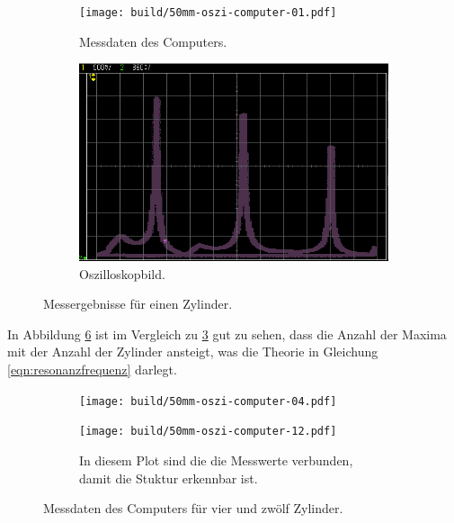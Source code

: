 \begin{figure}[ht]
    \centering
    \begin{subfigure}{0.49\textwidth}
        \centering
        \texttt{[image: build/50mm-oszi-computer-01.pdf]}
        \caption{Messdaten des Computers.}
        \label{fig:50mm-computer}
    \end{subfigure}
    \begin{subfigure}{0.49\textwidth}
        \centering
        \includegraphics[width=\textwidth]{data/Messaufgabe-2/01zylinder.png}
        \caption{Oszilloskopbild.}
        \label{fig:50mm-oszi}
    \end{subfigure}
    \caption{Messergebnisse für einen Zylinder.}
    \label{fig:50mm-oszi-computer-01}
\end{figure}

In Abbildung \ref{fig:50mm-computer-04-12} ist im Vergleich zu
\ref{fig:50mm-oszi-computer-01} gut zu sehen,
dass die Anzahl der Maxima mit der Anzahl der Zylinder ansteigt,
was die Theorie in Gleichung \eqref{eqn:resonanzfrequenz} darlegt.

\begin{figure}[ht]
    \centering
    \begin{subfigure}{0.49\textwidth}
        \centering
        \texttt{[image: build/50mm-oszi-computer-04.pdf]}
        \label{fig:50mm-computer-04}
    \end{subfigure}
    \begin{subfigure}{0.49\textwidth}
        \centering
        \caption{In diesem Plot sind die die Messwerte verbunden, damit die Stuktur erkennbar ist.}
        \texttt{[image: build/50mm-oszi-computer-12.pdf]}
        \label{fig:50mm-computer-12}
    \end{subfigure}
    \caption{Messdaten des Computers für vier und zwölf Zylinder.}
    \label{fig:50mm-computer-04-12}
\end{figure}
\FloatBarrier
